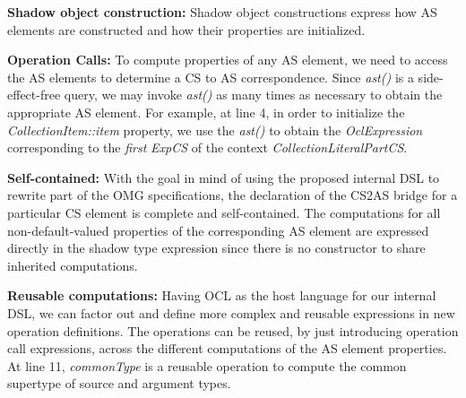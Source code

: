\documentclass{llncs}
\begin{document}
\textbf{Shadow object construction:} Shadow object constructions express how AS elements are constructed and how their properties are initialized. %

\textbf{Operation Calls:} To compute properties of any AS element, we  need to access the AS elements to determine a CS to AS correspondence.
Since \emph{ast()} is a side-effect-free query, we may invoke  \emph{ast()} as many times as necessary to obtain the appropriate AS element.
For example, at line 4, in order to initialize the \emph{CollectionItem::item} property, we use the \emph{ast()} to obtain the \emph{OclExpression} corresponding to the \emph{first} \emph{ExpCS} of the context \emph{CollectionLiteralPartCS}.

\textbf{Self-contained:} With the goal in mind of using the proposed internal DSL to rewrite part of the OMG specifications, the declaration of the CS2AS bridge for a particular CS element is complete and self-contained. The computations for all non-default-valued properties of the corresponding AS element are expressed directly in the shadow type expression since there is no constructor to share inherited computations.

\textbf{Reusable computations:} Having OCL as the  host language for our internal DSL, we can factor out and define more complex and reusable expressions in new operation definitions. The operations can be reused, by just introducing operation call expressions, across the different computations of the AS element properties. At line 11, \emph{commonType} is a reusable operation
 to compute the common supertype of source and argument types.

\end{document}
